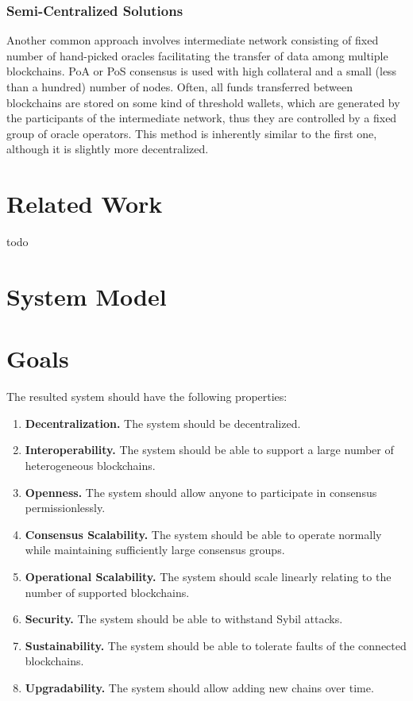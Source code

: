 \documentclass{article}
\begin{document}
\begin{sloppypar}
        \subsubsection{Semi-Centralized Solutions}\label{subsubsec:semi-centralized-solutions}

        Another common approach involves intermediate network consisting of fixed number of hand-picked oracles facilitating the transfer of data among multiple blockchains.
        PoA or PoS consensus is used with high collateral and a small (less than a hundred) number of nodes.
        Often, all funds transferred between blockchains are stored on some kind of threshold wallets, which are generated by the participants of the intermediate network, thus they are controlled by a fixed group of oracle operators.
        This method is inherently similar to the first one, although it is slightly more decentralized.


        \section{Related Work}\label{sec:related-work}

        todo


        \section{System Model}\label{sec:system-model}
        


        \section{Goals}\label{sec:goals}

        The resulted system should have the following properties:
        \begin{enumerate}
            \item \textbf{Decentralization.} The system should be decentralized.
            \item \textbf{Interoperability.} The system should be able to support a large number of heterogeneous blockchains.
            \item \textbf{Openness.} The system should allow anyone to participate in consensus permissionlessly.
            \item \textbf{Consensus Scalability.} The system should be able to operate normally while maintaining sufficiently large consensus groups.
            \item \textbf{Operational Scalability.} The system should scale linearly relating to the number of supported blockchains.
            \item \textbf{Security.} The system should be able to withstand Sybil attacks.
            \item \textbf{Sustainability.} The system should be able to tolerate faults of the connected blockchains.
            \item \textbf{Upgradability.} The system should allow adding new chains over time.
        \end{enumerate}



\end{sloppypar}
\end{document}
